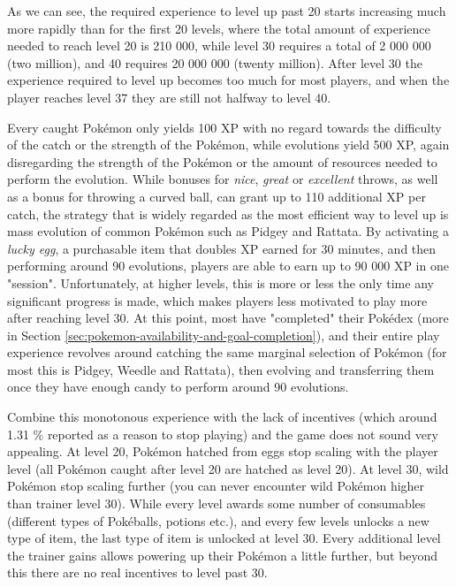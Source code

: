 As we can see, the required experience to level up past 20 starts increasing much more rapidly than for the first 20 levels, where the total amount of experience needed to reach level 20 is 210 000, while level 30 requires a total of 2 000 000 (two million), and 40 requires 20 000 000 (twenty million). After level 30 the experience required to level up becomes too much for most players, and when the player reaches level 37 they are still not halfway to level 40.

Every caught Pokémon only yields 100 XP with no regard towards the difficulty of the catch or the strength of the Pokémon, while evolutions yield 500 XP, again disregarding the strength of the Pokémon or the amount of resources needed to perform the evolution. While bonuses for \emph{nice}, \emph{great} or \emph{excellent} throws, as well as a bonus for throwing a curved ball, can grant up to 110 additional XP per catch, the strategy that is widely regarded as the most efficient way to level up is mass evolution of common Pokémon such as Pidgey and Rattata. By activating a \emph{lucky egg}, a purchasable item that doubles XP earned for 30 minutes, and then performing around 90 evolutions, players are able to earn up to 90 000 XP in one "session". Unfortunately, at higher levels, this is more or less the only time any significant progress is made, which makes players less motivated to play more after reaching level 30. At this point, most have "completed" their Pokédex (more in Section \ref{sec:pokemon-availability-and-goal-completion}), and their entire play experience revolves around catching the same marginal selection of Pokémon (for most this is Pidgey, Weedle and Rattata), then evolving and transferring them once they have enough candy to perform around 90 evolutions.

Combine this monotonous experience with the lack of incentives (which around 1.31 \% reported as a reason to stop playing) and the game does not sound very appealing. At level 20, Pokémon hatched from eggs stop scaling with the player level (all Pokémon caught after level 20 are hatched as level 20). At level 30, wild Pokémon stop scaling further (you can never encounter wild Pokémon higher than trainer level 30). While every level awards some number of consumables (different types of Pokéballs, potions etc.), and every few levels unlocks a new type of item, the last type of item is unlocked at level 30. Every additional level the trainer gains allows powering up their Pokémon a little further, but beyond this there are no real incentives to level past 30.

